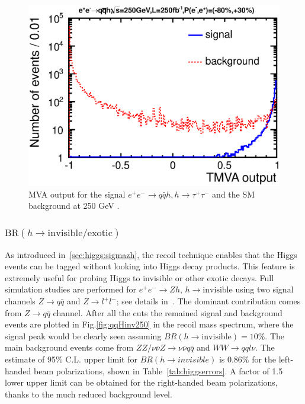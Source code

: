 \begin{figure}
\begin{center}
\includegraphics[width=0.85\hsize]{chapters/figures/ZH_qqtautau250_TMVA.eps}
\end{center}
  \caption{MVA output for the signal $e^+e^-\to q\bar{q} h, h\to\tau^+\tau^-$
 and the SM background at 250 GeV \cite{Kawada:2015wea}.}
  \label{fig:qqHtautau250}
\end{figure}

\subsubsection{$\mathrm{BR}(h\to \mathrm{invisible/exotic})$}
\label{sec:higgs:invisible}
As introduced in~\ref{sec:higgs:sigmazh}, the recoil technique enables that 
the Higgs events can be tagged without looking into Higgs decay products. 
This feature is extremely useful for probing Higgs to invisible or other exotic decays.
Full simulation studies are performed for $e^+e^-\to Zh$, $h\to\mathrm{invisible}$
using two signal channels $Z\to q\bar{q}$ and $Z\to l^+l^-$; 
see details in~\cite{Ishikawa:2014,Tian:2015,Kato:2016}. The dominant contribution comes
from $Z\to q\bar{q}$ channel. After all the cuts the remained signal and background events 
are plotted in Fig.\ref{fig:qqHinv250} in the recoil mass spectrum, where the signal
peak would be clearly seen assuming $BR(h\to\mathrm{invisible})=10\%$. 
The main background events come from $ZZ/\nu\bar{\nu}Z\to\nu\bar{\nu}q\bar{q}$ 
and $WW\to qql\nu$.
The estimate of 95\% C.L. upper limit for $BR(h\to invisible)$
is 0.86\% for the left-handed beam polarizations, shown in Table~\ref{tab:higgserrors}. 
A factor of 1.5 lower upper limit can be obtained for the right-handed beam polarizations,
thanks to the much reduced background level.

